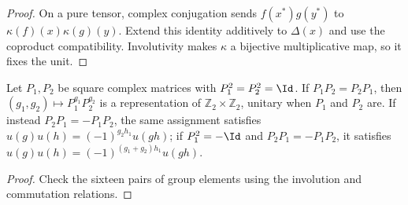 \begin{proof}
    \leanok
    On a pure tensor, complex conjugation sends
    $f(x^*)g(y^*)$ to $\kappa(f)(x)\kappa(g)(y)$.
    Extend this identity additively to $\Delta(x)$ and use the
    coproduct compatibility. Involutivity makes $\kappa$ a bijective
    multiplicative map, so it fixes the unit.
\end{proof}

\begin{lemma}
    \label{lem:elementary_klein_involutions}
    \leanok
    Let $P_1,P_2$ be square complex matrices with $P_1^2=P_2^2=\Id$. If
    $P_1P_2=P_2P_1$, then $(g_1,g_2)\mapsto P_1^{g_1}P_2^{g_2}$ is a
    representation of $\mathbb Z_2\times\mathbb Z_2$, unitary when $P_1$ and
    $P_2$ are. If instead $P_2P_1=-P_1P_2$, the same assignment satisfies
    $u(g)u(h)=(-1)^{g_2h_1}u(gh)$; if $P_1^2=-\Id$ and $P_2P_1=-P_1P_2$, it
    satisfies $u(g)u(h)=(-1)^{(g_1+g_2)h_1}u(gh)$.
\end{lemma}

\begin{proof}
    \leanok
    Check the sixteen pairs of group elements using the involution and
    commutation relations.
\end{proof}
